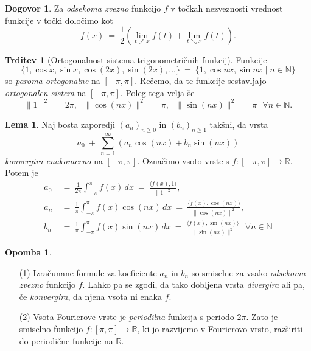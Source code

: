 \documentclass[11pt]{article}
\newcommand{\R}{\mathbb{R}}
\newcommand{\N}{\mathbb{N}}
\theoremstyle{definition}
\theoremstyle{definition}
\newtheorem{trditev}{Trditev}[section]
\theoremstyle{definition}
\theoremstyle{theorem}
\newtheorem{lema}{Lema}
\newtheorem*{dogovor}{Dogovor}
\newtheorem*{opomba}{Opomba}
\begin{document}
\begin{dogovor}

Za \textit{odsekoma zvezno} funkcijo $f$ v točkah nezveznosti vrednost funkcije v točki določimo kot
$$f(x) ~=~ \frac{1}{2} \left( \lim_{t \nearrow x} f(t) + \lim_{t \searrow x} f(t) \right).$$

\end{dogovor}
\vspace{0.5cm}

\begin{trditev}[Ortogonalnost sistema trigonometričnih funkcij]

Funkcije
$$\{ 1, \cos{x}, \sin{x}, \cos{(2x)}, \sin{(2x)}, \ldots \} ~=~ \{ 1, \cos{nx}, \sin{nx} \mid n \in \N \}$$
so \textit{paroma ortogonalne} na $[-\pi, \pi]$. Rečemo, da te funkcije sestavljajo \textit{\\\hbox{ortogonalen} sistem} na $[-\pi, \pi]$. Poleg tega velja še
$$\| 1 \|^2 ~=~ 2\pi, ~~~\| \cos{(nx)} \|^2 ~=~ \pi, ~~~\| \sin{(nx)} \|^2 ~=~ \pi ~~~\forall n \in \N.$$

\end{trditev}
\vspace{0.5cm}

\begin{lema}

Naj bosta zaporedji $(a_n)_{n \geq 0}$ in $(b_n)_{n \geq 1}$ takšni, da vrsta
$$a_0 ~+~ \sum_{n=1}^\infty (a_n \cos(nx) + b_n \sin(nx))$$
\textit{konvergira enakomerno} na $[-\pi, \pi]$. Označimo vsoto vrste s $f: [-\pi, \pi] \rightarrow \R$. Potem je
\begin{align*}
a_0 ~&=~ \frac{1}{2\pi} \int_{-\pi}^\pi f(x)\,dx ~=~ \frac{\langle f(x), 1 \rangle}{\| 1 \|^2}, \\
a_n ~&=~ \frac{1}{\pi} \int_{-\pi}^\pi f(x) \cos(nx)\,dx ~=~ \frac{\langle f(x), \cos(nx) \rangle}{\| \cos(nx) \|^2}, \\
b_n ~&=~ \frac{1}{\pi} \int_{-\pi}^\pi f(x) \sin(nx)\,dx ~=~ \frac{\langle f(x), \sin(nx) \rangle}{\| \sin(nx) \|^2} ~~~\forall n \in \N
\end{align*}

\end{lema}
\vspace{0.5cm}

\begin{opomba}
~
\begin{enumerate}

	\item[(1)] Izračunane formule za koeficiente $a_n$ in $b_n$ so smiselne za vsako \textit{\hbox{odsekoma} zvezno} funkcijo $f$. Lahko pa se zgodi, da tako dobljena vrsta \textit{divergira} ali pa, če \textit{konvergira}, da njena vsota ni enaka $f$.

	\item[(2)] Vsota Fourierove vrste je \textit{periodilna} funkcija s periodo $2\pi$. Zato je smiselno funkcijo $f: [\pi, \pi] \rightarrow \R$, ki jo razvijemo v Fourierovo vrsto, razširiti do periodične funkcije na $\R$.

\end{enumerate}

\end{opomba}
\vspace{0.5cm}
\end{document}
